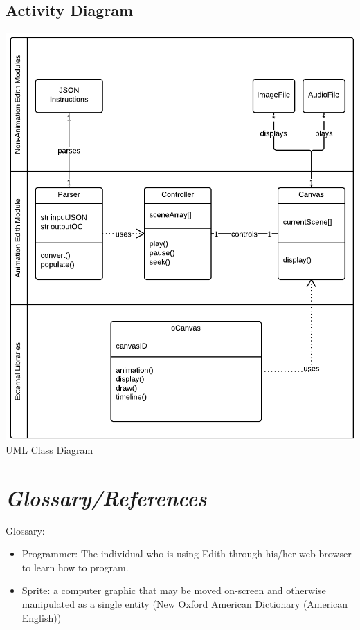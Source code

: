 \documentclass[12pt]{article}
\begin{document}
\subsection{Activity Diagram}
\includegraphics[scale=.45]{AnimationUMLClassDiagram.png}
\\UML Class Diagram
\pagebreak

\section{\emph{Glossary/References}}
Glossary:
\begin{itemize}
	\item Programmer: The individual who is using Edith through his/her web browser to learn how to program.
	\item Sprite: a computer graphic that may be moved on-screen and otherwise manipulated as a single entity (New Oxford American Dictionary (American English))
\end{itemize}
	

	
\end{document}
